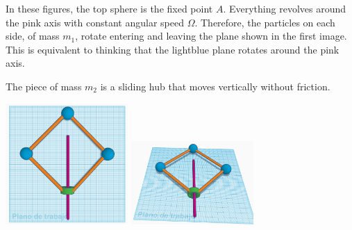 \documentclass[11pt, a4paper, twoside]{article}
\begin{document}
\begin{enumerate}
	In these figures, the top sphere is the fixed point \(A\). Everything revolves around the pink axis with constant angular speed $\Omega$. Therefore, the particles on each side, of mass $m_1$, rotate entering and leaving the plane shown in the first image. This is equivalent to thinking that the lightblue plane rotates around the pink axis.

	The piece of mass $m_2$ is a sliding hub that moves vertically without friction. 
	
	\begin{center}
		\includegraphics[width=0.35\textwidth]{figures/rotantesAcopladas3.png}
		\includegraphics[width=0.35\textwidth]{figures/rotantesAcopladas4.png}
	\end{center}
	


\end{enumerate}
\end{document}
